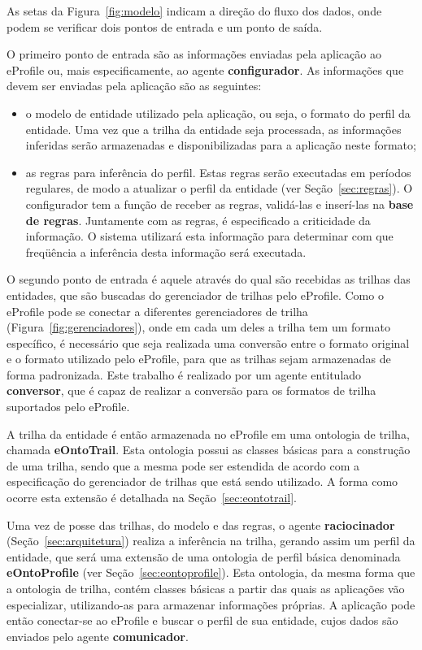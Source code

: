 As setas da Figura~\ref{fig:modelo} indicam a direção do fluxo dos dados, onde podem se verificar dois pontos de entrada e um ponto de saída.

O primeiro ponto de entrada são as informações enviadas pela aplicação ao eProfile ou, mais especificamente, ao agente {\bf configurador}. As informações que devem ser enviadas pela aplicação são as seguintes:

\begin{itemize}

\item o modelo de entidade utilizado pela aplicação, ou seja, o formato do perfil da entidade. Uma vez que a trilha da entidade seja processada, as informações inferidas serão armazenadas e disponibilizadas para a aplicação neste formato;

\item as regras para inferência do perfil. Estas regras serão executadas em períodos regulares, de modo a atualizar o perfil da entidade (ver Seção~\ref{sec:regras}). O configurador tem a função de receber as regras, validá-las e inserí-las na \textbf{base de regras}. Juntamente com as regras, é especificado a criticidade da informação. O sistema utilizará esta informação para determinar com que freqüência a inferência desta informação será executada.

\end{itemize}

O segundo ponto de entrada é aquele através do qual são recebidas as trilhas das entidades, que são buscadas do gerenciador de trilhas pelo eProfile. Como o eProfile pode se conectar a diferentes gerenciadores de trilha (Figura~\ref{fig:gerenciadores}), onde em cada um deles a trilha tem um formato específico, é necessário que seja realizada uma conversão entre o formato original e o formato utilizado pelo eProfile, para que as trilhas sejam armazenadas de forma padronizada. Este trabalho é realizado por um agente entitulado {\bf conversor}, que é capaz de realizar a conversão para os formatos de trilha suportados pelo eProfile.

A trilha da entidade é então armazenada no eProfile em uma ontologia de trilha, chamada {\bf eOntoTrail}. Esta ontologia possui as classes básicas para a construção de uma trilha, sendo que a mesma pode ser estendida de acordo com a especificação do gerenciador de trilhas que está sendo utilizado. A forma como ocorre esta extensão é detalhada na Seção~\ref{sec:eontotrail}.

Uma vez de posse das trilhas, do modelo e das regras, o agente \textbf{raciocinador} (Seção~\ref{sec:arquitetura}) realiza a inferência na trilha, gerando assim um perfil da entidade, que será uma extensão de uma ontologia de perfil básica denominada {\bf eOntoProfile} (ver Seção~\ref{sec:eontoprofile}). Esta ontologia, da mesma forma que a ontologia de trilha, contém classes básicas a partir das quais as aplicações vão especializar, utilizando-as para armazenar informações próprias. A aplicação pode então conectar-se ao eProfile e buscar o perfil de sua entidade, cujos dados são enviados pelo agente \textbf{comunicador}.






